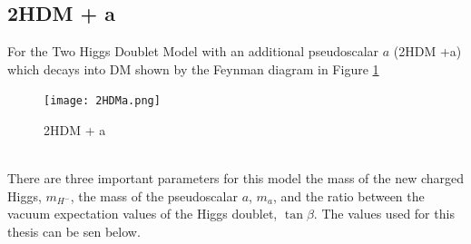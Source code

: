 \documentclass[12pt, a4paper]{book}
\begin{document}
\subsection{2HDM + a}
For the Two Higgs Doublet Model with an additional pseudoscalar $a$ (2HDM +a) which decays into DM shown by the Feynman diagram in Figure \ref{fig:2HDM}
\begin{figure}[!ht]
    \centering
    \texttt{[image: 2HDMa.png]}
    \caption{2HDM + a}\label{fig:2HDM}
\end{figure}
\\ There are three important parameters for this model the mass of the new charged Higgs, $m_{H^-}$, the mass of the pseudoscalar $a$, $m_a$, and the ratio between the vacuum expectation values of the Higgs doublet, $\tan\beta$. The values used for this thesis can be sen below.
\graphicspath{{../../../Plots/2d_masses/}}
\end{document}

